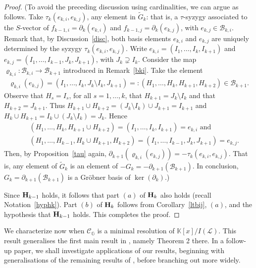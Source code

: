 \documentclass[ALCO]{cedram}
\newcommand{\mbk}{\mbox{$\mathbb{K}$}}
\newcommand{\mcb}{\mbox{$\mathcal{B}$}}
\newcommand{\mcc}{\mbox{$\mathcal{C}$}}
\newcommand{\mcl}{\mbox{$\mathcal{L}$}}
\newcommand{\mbfh}{\mbox{${\bf H}$}}
\newcommand{\dif}{\mbox{$\partial$}}
\begin{document}
\begin{proof}
(To avoid the preceding discussion using cardinalities, we can argue
as follows. Take $\tau_{k}(e_{k,i},e_{k,j})$, any element in
$\tilde{G}_k$: that is, a $\tau$-syzygy associated to the $S$-vector
of $f_{k-1,i}=\dif_k(e_{k,i})$ and $f_{k-1,j}=\dif_{k}(e_{k,j})$, with
$e_{k,j}\in\mcb_{k,i}$. Remark that, by Discussion~\ref{disc}, both
basis elements $e_{k,i}$ and $e_{k,j}$ are uniquely determined by the
syzygy $\tau_k(e_{k,i},e_{k,j})$. Write $e_{k,i}=(I_1,\ldots
,I_{k},I_{k+1})$ and $e_{k,j}=(I_1,\ldots ,I_{k-1},J_{k},J_{k+1})$,
with $J_{k}\supsetneq I_{k}$. Consider the map
$\varrho_{k,i}:\mcb_{k,i}\to \mcb_{k+1}$ introduced in
Remark~\ref{bki}. Take the element
\begin{eqnarray*}
\varrho_{k,i}(e_{k,j})=(I_1,\ldots,I_{k},J_{k}\setminus
I_{k},J_{k+1})=:(H_1,\ldots,H_k,H_{k+1},H_{k+2})\in\mcb_{k+1}.
\end{eqnarray*}
Observe that $H_s=I_s$, for all $s=1,\ldots ,k$, that
$H_{k+1}=J_{k}\setminus I_{k}$ and that $H_{k+2}=J_{k+1}$. Thus
$H_{k+1}\cup H_{k+2}=(J_{k}\setminus I_{k})\cup J_{k+1}=I_{k+1}$ and
$H_{k}\cup H_{k+1}=I_{k}\cup (J_{k}\setminus I_{k})=J_{k}$. Hence
\begin{eqnarray*}
&& (H_1,\ldots ,H_{k},H_{k+1}\cup H_{k+2})=(I_1,\ldots
  ,I_{k},I_{k+1})=e_{k,i}\mbox{ and }\\ && (H_1,\ldots
  ,H_{k-1},H_{k}\cup H_{k+1},H_{k+2})=(I_1,\ldots
  ,I_{k-1},J_{k},J_{k+1})=e_{k,j}.
\end{eqnarray*}
Then, by Proposition~\ref{tau} again,
$\dif_{k+1}(\varrho_{k,i}(e_{k,j}))=-\tau_{k}(e_{k,i},e_{k,j})$. That
is, any element of $\tilde{G}_k$ is an element of
$-G_{k}=-\dif_{k+1}(\mcb_{k+1})$. In conclusion,
$G_{k}=\dif_{k+1}(\mcb_{k+1})$ is a Gr\"obner basis of
$\ker(\dif_{k})$.)

Since $\mbfh_{k-1}$ holds, it follows that part $(a)$ of
$\mbfh_k$ also holds (recall Notation~\ref{hyphk}). Part $(b)$ of
$\mbfh_k$ follows from Corollary~\ref{ltbij}, $(a)$, and the
hypothesis that $\mbfh_{k-1}$ holds. This completes the proof.
\end{proof}

We characterize now when $\mcc_{\mathbb{G}}$ is a minimal resolution
of $\mbk[x]/I(\mcl)$. This result generalises the first main result in
\cite{ms}, namely Theorem 2 there. In a follow-up paper, we shall
investigate applications of our results, beginning with
generalisations of the remaining results of \cite{ms}, before
branching out more widely.
\end{document}
